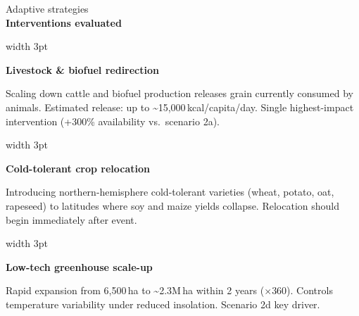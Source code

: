 \documentclass[final]{beamer}
\newlength{\fullwidth}           %
\newenvironment{labelblock}[2]{%
  \begin{block}{%
      {\small\color{structure.fg!70!bg}#1}%
      \\[2pt]                                  %
      {\large\bfseries#2}%
      }%
      }{%
  \end{block}%
  }
\begin{document}
\begin{frame}[t]
\begin{columns}[t]
\begin{column}{\fullwidth}
\begin{labelblock}{Adaptive strategies}{Interventions evaluated}
        \begin{minipage}[t]{0.22\linewidth}
          \raggedright
          \textcolor{tealmid}{\vrule width 3pt}\hspace{3pt}%
          \begin{minipage}[t]{\dimexpr\linewidth-6pt\relax}
            {\bfseries\small Livestock \& biofuel redirection}\par\vspace{2pt}
            {\footnotesize Scaling down cattle and biofuel production releases grain
            currently consumed by animals. Estimated release: up to
            {\textasciitilde}15,000\,kcal/capita/day. Single highest-impact
            intervention (+300\% availability vs.\ scenario 2a).}
          \end{minipage}
        \end{minipage}\hfill
        \begin{minipage}[t]{0.22\linewidth}
          \raggedright
          \textcolor{tealmid}{\vrule width 3pt}\hspace{3pt}%
          \begin{minipage}[t]{\dimexpr\linewidth-6pt\relax}
            {\bfseries\small Cold-tolerant crop relocation}\par\vspace{2pt}
            {\footnotesize Introducing northern-hemisphere cold-tolerant varieties
            (wheat, potato, oat, rapeseed) to latitudes where soy and maize yields
            collapse. Relocation should begin immediately after event.}
          \end{minipage}
        \end{minipage}\hfill
        \begin{minipage}[t]{0.22\linewidth}
          \raggedright
          \textcolor{ambermid}{\vrule width 3pt}\hspace{3pt}%
          \begin{minipage}[t]{\dimexpr\linewidth-6pt\relax}
            {\bfseries\small Low-tech greenhouse scale-up}\par\vspace{2pt}
            {\footnotesize Rapid expansion from 6,500\,ha to {\textasciitilde}2.3M\,ha
            within 2 years ($\times$360). Controls temperature variability under
            reduced insolation. Scenario 2d key driver.}
          \end{minipage}
        \end{minipage}\hfill
        \begin{minipage}[t]{0.22\linewidth}

\end{minipage}
\end{labelblock}
\end{column}
\end{columns}
\end{frame}
\end{document}
